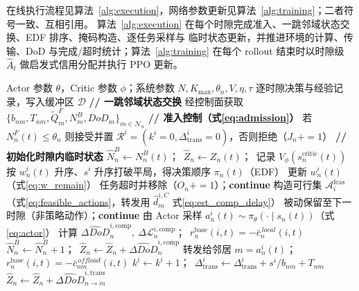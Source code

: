 \documentclass[a4paper,11pt]{article}
\begin{document}
在线执行流程见算法~\ref{alg:execution}，网络参数更新见算法~\ref{alg:training}；二者符号一致、互相引用。
算法~\ref{alg:execution} 在每个时隙完成准入、一跳邻域状态交换、EDF 排序、掩码构造、逐任务采样与
临时状态更新，并推进环境的计算、传输、DoD 与完成/超时统计；算法~\ref{alg:training} 在每个 rollout
结束时以时隙级 $\hat{A}_t$ 做启发式信用分配并执行 PPO 更新。

\begin{algorithm}[t]
\caption{DA-MAPPO 在线执行（单 rollout，分布式执行）}
\label{alg:execution}
\begin{algorithmic}[1]
\REQUIRE Actor 参数 $\theta$，Critic 参数 $\phi$；系统参数 $N,K_{\max},\theta_n,V,\eta,\tau$
\ENSURE 逐时隙决策与经验记录，写入缓冲区 $\mathcal{D}$
    \STATE \textbf{// 一跳邻域状态交换}
    \STATE 经控制面获取 $\{b_{nm},T_{nm},\tilde{Q}^F_m,N^B_m,DoD_m\}_{m\in\mathcal{N}_n}$
    \STATE \textbf{// 准入控制（式\eqref{eq:admission}）}
      \STATE 若 $N^F_n(t)\le\theta_n$ 则接受并置 $\mathcal{R}^i=(k^i{=}0,\Delta^i_{\mathrm{trans}}{=}0)$，否则拒绝（$J_n{+}{=}1$）
    \ENDFOR
    \STATE \textbf{// 初始化时隙内临时状态}
    \STATE $\hat{N}^B_n \leftarrow N^B_n(t)$；\ $\hat{Z}_n \leftarrow Z_n(t)$；\ 记录 $V_\phi(s^{\mathrm{critic}}_n(t))$
    \STATE 按 $w^i_n(t)$ 升序、$s^i$ 升序打破平局，得决策顺序 $\pi_n(t)$（EDF）
      \STATE 更新 $w^i_n(t)$（式\eqref{eq:w_remain}）
        \STATE 任务超时并移除（$O_n{+}{=}1$）；\textbf{continue}
      \ENDIF
      \STATE 构造可行集 $\mathcal{A}^{\mathrm{feas}}_i$（式\eqref{eq:feasible_actions}，转发用 $\hat{d}^{i,C}_m$ 式\eqref{eq:est_comp_delay}）
        \STATE 被动保留至下一时隙（非策略动作）；\textbf{continue}
      \ENDIF
      \STATE 由 Actor 采样 $a^i_n(t)\sim\pi_\theta(\cdot\mid s_n(t))$（式\eqref{eq:actor}）
        \STATE 计算 $\widehat{\Delta DoD}^{i,\mathrm{comp}}_n,\ \Delta\mathcal{L}^{i,\mathrm{comp}}_n$；\ $r^{\mathrm{base}}_n(i,t)=-\bar{c}^{\,local}_n(i,t)$
        \STATE $\hat{N}^B_n \leftarrow \hat{N}^B_n+1$；\ $\hat{Z}_n \leftarrow \hat{Z}_n+\widehat{\Delta DoD}^{i,\mathrm{comp}}_n$
      \ELSE
        \STATE 转发给邻居 $m=a^i_n(t)$；\ $r^{\mathrm{base}}_n(i,t)=-\bar{c}^{\,offload}_{nm}(i,t)$
        \STATE $k^i \leftarrow k^i+1$；\ $\Delta^i_{\mathrm{trans}} \leftarrow \Delta^i_{\mathrm{trans}}+s^i/b_{nm}+T_{nm}$
        \STATE $\hat{Z}_n \leftarrow \hat{Z}_n+\widehat{\Delta DoD}^{i,\mathrm{trans}}_{n\to m}$

\end{algorithmic}
\end{algorithm}
\end{document}
